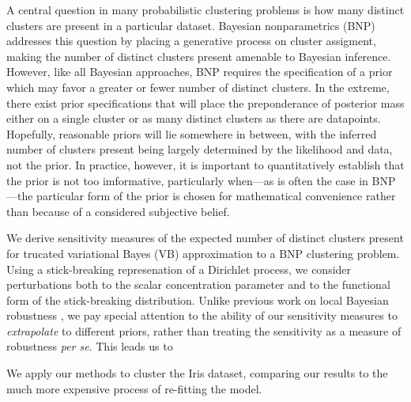 
A central question in many probabilistic clustering problems is how many
distinct clusters are present in a particular dataset.
Bayesian nonparametrics (BNP) addresses this question by placing a generative
process on cluster assigment, making the number of distinct clusters present
amenable to Bayesian inference.  However, like all Bayesian approaches, BNP
requires the specification of a prior which may favor a greater or fewer number
of distinct clusters.  In the extreme, there exist prior specifications that
will place the preponderance of posterior mass either on a single cluster or as
many distinct clusters as there are datapoints.  Hopefully, reasonable priors
will lie somewhere in between, with the inferred number of clusters present
being largely determined by the likelihood and data, not the prior.  In
practice, however, it is important to quantitatively establish that the prior is
not too imformative, particularly when---as is often the case in BNP---the
particular form of the prior is chosen for mathematical convenience rather than
because of a considered subjective belief.

We derive sensitivity measures of the expected number of distinct clusters
present for trucated variational Bayes (VB) approximation to a BNP clustering
problem.  Using a stick-breaking represenation of a Dirichlet process, we
consider perturbations both to the scalar concentration parameter and to the
functional form of the stick-breaking distribution.  Unlike previous work on
local Bayesian robustness \citep{gustafson:1996:localposterior,
Basu:2000:BNP_robustness}, we pay special attention to the ability of our
sensitivity measures to \emph{extrapolate} to different priors, rather than
treating the sensitivity as a measure of robustness \textit{per se}.  This
leads us to

We apply our methods to cluster the Iris \citep{iris_data_anderson,
iris_data_fisher} dataset, comparing our results to the much more expensive
process of re-fitting the model.


